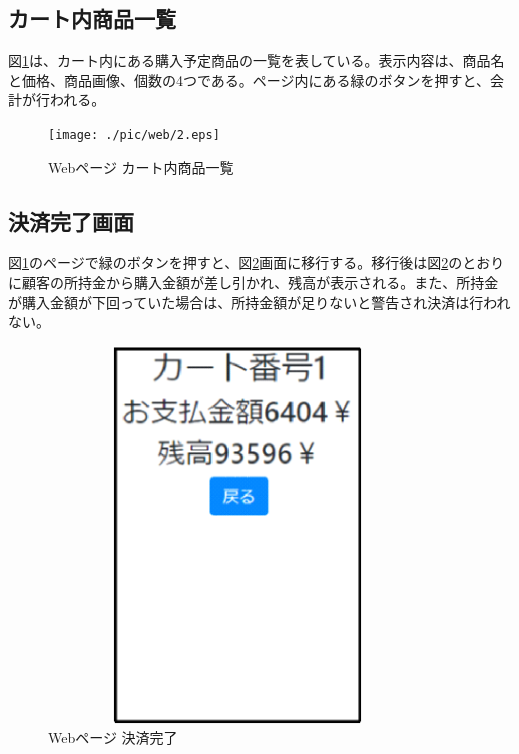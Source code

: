 \subsection*{カート内商品一覧}
図\ref{web_cart_items}は、カート内にある購入予定商品の一覧を表している。表示内容は、商品名と価格、商品画像、個数の4つである。ページ内にある緑のボタンを押すと、会計が行われる。
\begin{figure}[htbp]
\centering
\texttt{[image: ./pic/web/2.eps]}
\caption{Webページ カート内商品一覧}
\label{web_cart_items}
\end{figure}

\subsection*{決済完了画面}
図\ref{web_cart_items}のページで緑のボタンを押すと、図\ref{web_checksum}画面に移行する。移行後は図\ref{web_checksum}のとおりに顧客の所持金から購入金額が差し引かれ、残高が表示される。また、所持金が購入金額が下回っていた場合は、所持金額が足りないと警告され決済は行われない。
\begin{figure}[htbp]
\centering
\includegraphics[width=10cm,height=10cm]{./pic/web/3.eps}
\caption{Webページ 決済完了}
\label{web_checksum}
\end{figure}

\newpage